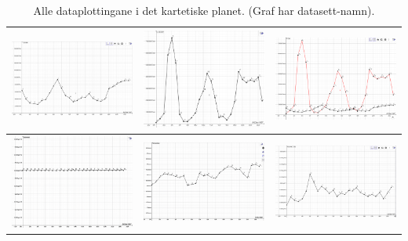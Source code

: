 \documentclass{report}
\begin{document}
\begin{table}[H]
	\centering
	\begin{tabular}{|l|l|l|}
		\hline
		\includegraphics[width=5.5cm]{Bileter/Torsk.png} & \includegraphics[width=5.5cm]{Bileter/Lodde.png} & \includegraphics[width=5.5cm]{Bileter/loddeogtorsk.png} \\
		\hline
		\includegraphics[width=5.5cm]{Bileter/Salt.png}  & \includegraphics[width=5.5cm]{Bileter/Temp.png}  & \includegraphics[width=5.5cm]{Bileter/PLANKTON..png}    \\
		\hline
	\end{tabular}
	\caption{Alle dataplottingane i det kartetiske planet. (Graf har datasett-namn).}
	\label{F3}
\end{table}
\end{document}
